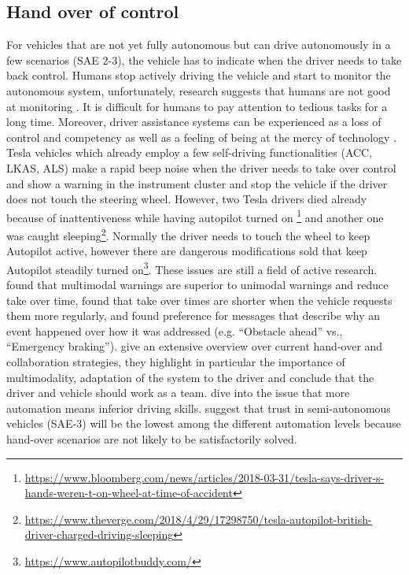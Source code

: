 \subsection{Hand over of control}
For vehicles that are not yet fully autonomous but can drive autonomously in a few scenarios (SAE 2-3), the vehicle has to indicate when the driver needs to take back control. Humans stop actively driving the vehicle and start to monitor the autonomous system, unfortunately, research suggests that humans are not good at monitoring \cite{Naujoks2014TheConditions.}. It is difficult for humans to pay attention to tedious tasks for a long time. Moreover, driver assistance systems can be experienced as a loss of control and competency as well as a feeling of being at the mercy of technology \cite{Eckoldt2012AnSystems}. Tesla vehicles which already employ a few self-driving functionalities (ACC, LKAS, ALS) make a rapid beep noise when the driver needs to take over control and show a warning in the instrument cluster and stop the vehicle if the driver does not touch the steering wheel. However, two Tesla drivers died already because of inattentiveness while having autopilot turned on \footnote{\url{https://www.bloomberg.com/news/articles/2018-03-31/tesla-says-driver-s-hands-weren-t-on-wheel-at-time-of-accident}} and another one was caught sleeping\footnote{\url{https://www.theverge.com/2018/4/29/17298750/tesla-autopilot-british-driver-charged-driving-sleeping}}. Normally the driver needs to touch the wheel to keep Autopilot active, however there are dangerous modifications sold that keep Autopilot steadily turned on\footnote{\url{https://www.autopilotbuddy.com/}}. These issues are still a field of active research. \cite{Politis} found that multimodal warnings are superior to unimodal warnings and reduce take over time, \cite{Merat2014TransitionVehicle} found that take over times are shorter when the vehicle requests them more regularly, and \cite{Koo2015} found preference for messages that describe why an event happened over how it was addressed (e.g. “Obstacle ahead” vs., “Emergency braking”).  \cite{Walch2017} give an extensive overview over current hand-over and collaboration strategies, they highlight in particular the importance of multimodality, adaptation of the system to the driver and conclude that the driver and vehicle should work as a team. \cite{Meschtscherjakova} dive into the issue that more automation means inferior driving skills. \cite{Rodel} suggest that trust in semi-autonomous vehicles (SAE-3) will be the lowest among the different automation levels because hand-over scenarios are not likely to be satisfactorily solved. 



